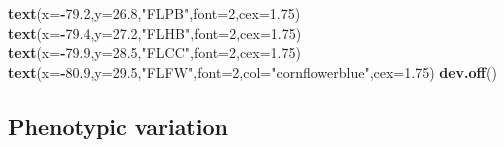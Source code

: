 \documentclass[11pt,]{article}
\newenvironment{Shaded}{\begin{snugshade}}{\end{snugshade}}
\newcommand{\KeywordTok}[1]{\textcolor[rgb]{0.13,0.29,0.53}{\textbf{#1}}}
\newcommand{\DataTypeTok}[1]{\textcolor[rgb]{0.13,0.29,0.53}{#1}}
\newcommand{\DecValTok}[1]{\textcolor[rgb]{0.00,0.00,0.81}{#1}}
\newcommand{\FloatTok}[1]{\textcolor[rgb]{0.00,0.00,0.81}{#1}}
\newcommand{\StringTok}[1]{\textcolor[rgb]{0.31,0.60,0.02}{#1}}
\newcommand{\OperatorTok}[1]{\textcolor[rgb]{0.81,0.36,0.00}{\textbf{#1}}}
\newcommand{\NormalTok}[1]{#1}
\begin{document}
\begin{Shaded}
\begin{Highlighting}[]
\KeywordTok{text}\NormalTok{(}\DataTypeTok{x=}\OperatorTok{-}\FloatTok{79.2}\NormalTok{,}\DataTypeTok{y=}\FloatTok{26.8}\NormalTok{,}\StringTok{"FLPB"}\NormalTok{,}\DataTypeTok{font=}\DecValTok{2}\NormalTok{,}\DataTypeTok{cex=}\FloatTok{1.75}\NormalTok{)}
\KeywordTok{text}\NormalTok{(}\DataTypeTok{x=}\OperatorTok{-}\FloatTok{79.4}\NormalTok{,}\DataTypeTok{y=}\FloatTok{27.2}\NormalTok{,}\StringTok{"FLHB"}\NormalTok{,}\DataTypeTok{font=}\DecValTok{2}\NormalTok{,}\DataTypeTok{cex=}\FloatTok{1.75}\NormalTok{)}
\KeywordTok{text}\NormalTok{(}\DataTypeTok{x=}\OperatorTok{-}\FloatTok{79.9}\NormalTok{,}\DataTypeTok{y=}\FloatTok{28.5}\NormalTok{,}\StringTok{"FLCC"}\NormalTok{,}\DataTypeTok{font=}\DecValTok{2}\NormalTok{,}\DataTypeTok{cex=}\FloatTok{1.75}\NormalTok{)}
\KeywordTok{text}\NormalTok{(}\DataTypeTok{x=}\OperatorTok{-}\FloatTok{80.9}\NormalTok{,}\DataTypeTok{y=}\FloatTok{29.5}\NormalTok{,}\StringTok{"FLFW"}\NormalTok{,}\DataTypeTok{font=}\DecValTok{2}\NormalTok{,}\DataTypeTok{col=}\StringTok{"cornflowerblue"}\NormalTok{,}\DataTypeTok{cex=}\FloatTok{1.75}\NormalTok{)}
\KeywordTok{dev.off}\NormalTok{()}
\end{Highlighting}
\end{Shaded}

\subsection{Phenotypic variation}\label{phenotypic-variation}
\end{document}
